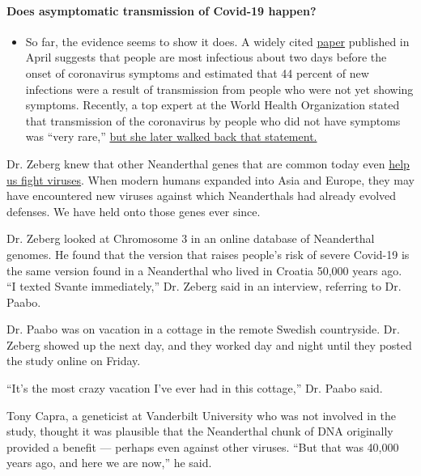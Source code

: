 \begin{itemize}
{  \paragraph{Does asymptomatic transmission of Covid-19
  happen?}\label{does-asymptomatic-transmission-of-covid-19-happen}}

  \begin{itemize}
  \tightlist
  \item
    So far, the evidence seems to show it does. A widely cited
    \href{https://www.nature.com/articles/s41591-020-0869-5}{paper}
    published in April suggests that people are most infectious about
    two days before the onset of coronavirus symptoms and estimated that
    44 percent of new infections were a result of transmission from
    people who were not yet showing symptoms. Recently, a top expert at
    the World Health Organization stated that transmission of the
    coronavirus by people who did not have symptoms was ``very rare,''
    \href{https://www.nytimes.com/2020/06/09/world/coronavirus-updates.html?action=click\&pgtype=Article\&state=default\&region=MAIN_CONTENT_3\&context=storylines_faq\#link-1f302e21}{but
    she later walked back that statement.}
  \end{itemize}
\end{itemize}

Dr. Zeberg knew that other Neanderthal genes that are common today even
\href{https://www.nytimes.com/2018/10/04/science/neanderthal-genes-viruses.html}{help
us fight viruses}. When modern humans expanded into Asia and Europe,
they may have encountered new viruses against which Neanderthals had
already evolved defenses. We have held onto those genes ever since.

Dr. Zeberg looked at Chromosome 3 in an online database of Neanderthal
genomes. He found that the version that raises people's risk of severe
Covid-19 is the same version found in a Neanderthal who lived in Croatia
50,000 years ago. ``I texted Svante immediately,'' Dr. Zeberg said in an
interview, referring to Dr. Paabo.

Dr. Paabo was on vacation in a cottage in the remote Swedish
countryside. Dr. Zeberg showed up the next day, and they worked day and
night until they posted the study online on Friday.

``It's the most crazy vacation I've ever had in this cottage,'' Dr.
Paabo said.

Tony Capra, a geneticist at Vanderbilt University who was not involved
in the study, thought it was plausible that the Neanderthal chunk of DNA
originally provided a benefit --- perhaps even against other viruses.
``But that was 40,000 years ago, and here we are now,'' he said.

